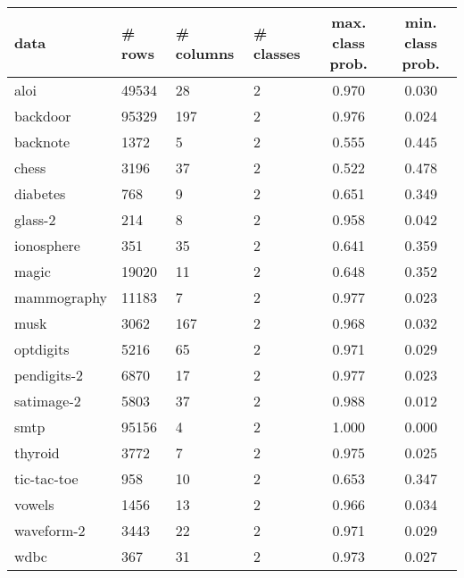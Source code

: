 \begin{table}[ht]
\centering
\begin{tabular}{|l|ll|l|cc|}
  \hline
data & \# rows & \# columns & \# classes & max. class prob. & min. class prob. \\ 
  \hline
aloi & 49534 &   28 &    2 & 0.970 & 0.030 \\ 
  backdoor & 95329 &  197 &    2 & 0.976 & 0.024 \\ 
  backnote & 1372 &    5 &    2 & 0.555 & 0.445 \\ 
  chess & 3196 &   37 &    2 & 0.522 & 0.478 \\ 
  diabetes &  768 &    9 &    2 & 0.651 & 0.349 \\ 
  glass-2 &  214 &    8 &    2 & 0.958 & 0.042 \\ 
  ionosphere &  351 &   35 &    2 & 0.641 & 0.359 \\ 
  magic & 19020 &   11 &    2 & 0.648 & 0.352 \\ 
  mammography & 11183 &    7 &    2 & 0.977 & 0.023 \\ 
  musk & 3062 &  167 &    2 & 0.968 & 0.032 \\ 
  optdigits & 5216 &   65 &    2 & 0.971 & 0.029 \\ 
  pendigits-2 & 6870 &   17 &    2 & 0.977 & 0.023 \\ 
  satimage-2 & 5803 &   37 &    2 & 0.988 & 0.012 \\ 
  smtp & 95156 &    4 &    2 & 1.000 & 0.000 \\ 
  thyroid & 3772 &    7 &    2 & 0.975 & 0.025 \\ 
  tic-tac-toe &  958 &   10 &    2 & 0.653 & 0.347 \\ 
  vowels & 1456 &   13 &    2 & 0.966 & 0.034 \\ 
  waveform-2 & 3443 &   22 &    2 & 0.971 & 0.029 \\ 
  wdbc &  367 &   31 &    2 & 0.973 & 0.027 \\ 
  \hline
  

\end{tabular}
\end{table}
